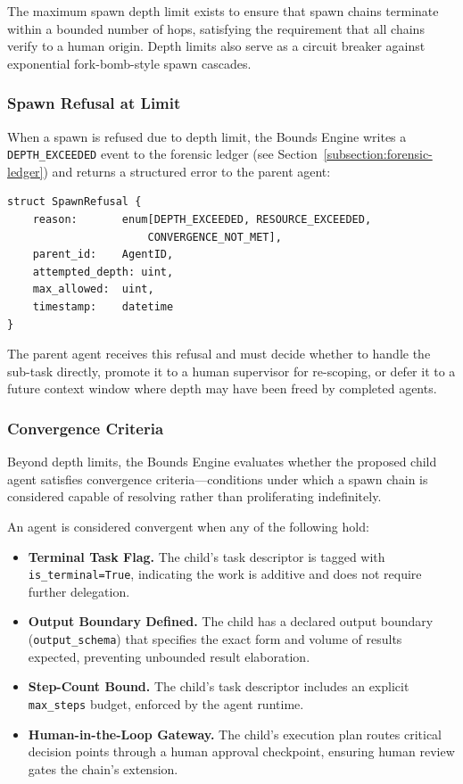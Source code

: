 The maximum spawn depth limit exists to ensure that spawn chains terminate within a bounded number of hops, satisfying the requirement that all chains verify to a human origin. Depth limits also serve as a circuit breaker against exponential fork-bomb-style spawn cascades.

\subsubsection{Spawn Refusal at Limit}
\label{subsubsection:spawn-refusal-at-limit}

When a spawn is refused due to depth limit, the Bounds Engine writes a \texttt{DEPTH\_EXCEEDED} event to the forensic ledger (see Section~\ref{subsection:forensic-ledger}) and returns a structured error to the parent agent:

\begin{verbatim}
struct SpawnRefusal {
    reason:       enum[DEPTH_EXCEEDED, RESOURCE_EXCEEDED, 
                      CONVERGENCE_NOT_MET],
    parent_id:    AgentID,
    attempted_depth: uint,
    max_allowed:  uint,
    timestamp:    datetime
}
\end{verbatim}

The parent agent receives this refusal and must decide whether to handle the sub-task directly, promote it to a human supervisor for re-scoping, or defer it to a future context window where depth may have been freed by completed agents.

\subsubsection{Convergence Criteria}
\label{subsubsection:convergence-criteria}

Beyond depth limits, the Bounds Engine evaluates whether the proposed child agent satisfies convergence criteria---conditions under which a spawn chain is considered capable of resolving rather than proliferating indefinitely.

An agent is considered convergent when any of the following hold:

\begin{itemize}
    \item \textbf{Terminal Task Flag.} The child's task descriptor is tagged with \texttt{is\_terminal=True}, indicating the work is additive and does not require further delegation.
    \item \textbf{Output Boundary Defined.} The child has a declared output boundary (\texttt{output\_schema}) that specifies the exact form and volume of results expected, preventing unbounded result elaboration.
    \item \textbf{Step-Count Bound.} The child's task descriptor includes an explicit \texttt{max\_steps} budget, enforced by the agent runtime.
    \item \textbf{Human-in-the-Loop Gateway.} The child's execution plan routes critical decision points through a human approval checkpoint, ensuring human review gates the chain's extension.
\end{itemize}

